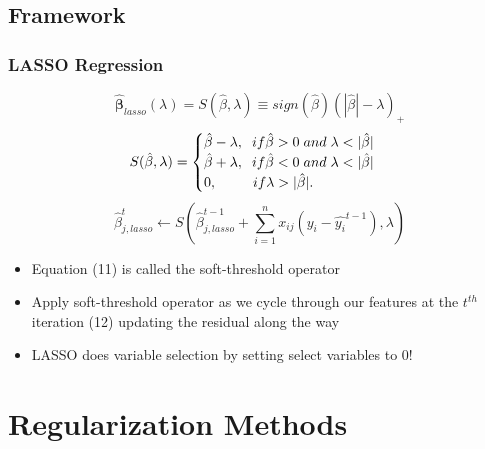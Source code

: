 \documentclass[]{beamer}
\begin{document}
\subsection{Framework}
\begin{frame}
\frametitle{LASSO Regression}   %
\begin{equation}
\boldsymbol{\hat{\beta}}_{lasso}(\lambda) = S(\hat{\beta},\lambda) \equiv sign(\hat{\beta})(|\hat{\beta}|-\lambda)_+ 
\end{equation}
\[
S(\hat{\beta},\lambda) =\begin{cases}
\hat{\beta} -  \lambda, \hspace{0.2cm} if \hat{\beta} > 0 \hspace{0.1cm} and \hspace{0.1cm} \lambda < | \hat{\beta} | \\
\hat{\beta} + \lambda, \hspace{0.2cm} if \hat{\beta} < 0 \hspace{0.1cm}and \hspace{0.1cm} \lambda < |\hat{\beta}| \\
0, \hspace{0.9cm} if  \lambda > |\hat{\beta} |.
\end{cases}
\]
\begin{equation}
\hat{\beta}_{j,lasso}^{t} \leftarrow S( \hat{\beta}_{j,lasso}^{t-1} +  \sum_{i=1}^{n} x_{ij} (y_i - \hat{y_{i}}^{t-1}), \lambda)
\end{equation}
\begin{itemize}
\item<1-> Equation (11) is called the soft-threshold operator 
\item<2-> Apply soft-threshold operator as we cycle through our features at the $t^{th}$ iteration (12) updating the residual along the way
\item<3-> LASSO does variable selection by setting select variables to 0!
\end{itemize}
\end{frame}

\section{Regularization Methods}
\end{document}
